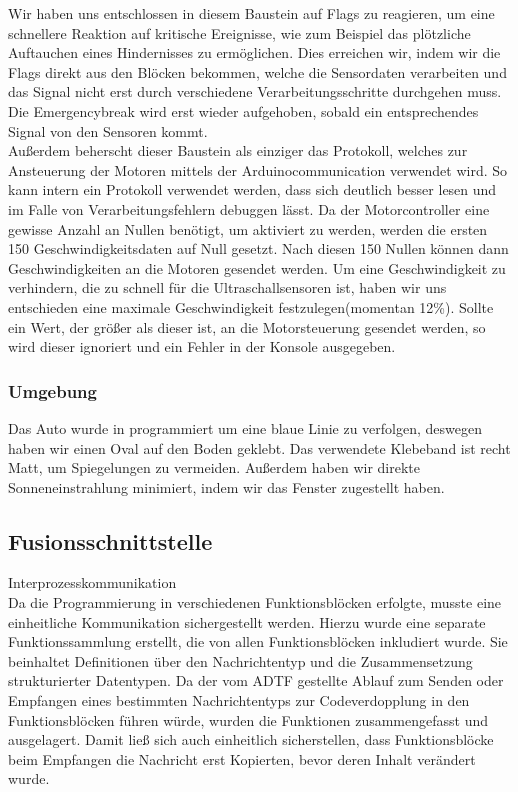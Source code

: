 \documentclass[12pt,a4paper]{report}
\begin{document}
Wir haben uns entschlossen in diesem Baustein auf Flags zu reagieren, um eine schnellere Reaktion auf kritische Ereignisse, wie zum Beispiel das plötzliche Auftauchen eines Hindernisses zu ermöglichen. Dies erreichen wir, indem wir die Flags direkt aus den Blöcken bekommen, welche die Sensordaten verarbeiten und das Signal nicht erst durch verschiedene Verarbeitungsschritte durchgehen muss. Die Emergencybreak wird erst wieder aufgehoben, sobald ein entsprechendes Signal von den Sensoren kommt.\\

Außerdem beherscht dieser Baustein als einziger das Protokoll, welches zur Ansteuerung der Motoren mittels der Arduinocommunication verwendet wird. So kann intern ein Protokoll verwendet werden, dass sich deutlich besser lesen und im Falle von Verarbeitungsfehlern debuggen lässt. Da der Motorcontroller eine gewisse Anzahl an Nullen benötigt, um aktiviert zu werden, werden die ersten 150 Geschwindigkeitsdaten auf Null gesetzt. Nach diesen 150 Nullen können dann Geschwindigkeiten an die Motoren gesendet werden. Um eine Geschwindigkeit zu verhindern, die zu schnell für die Ultraschallsensoren ist, haben wir uns entschieden eine maximale Geschwindigkeit festzulegen(momentan 12\%). Sollte ein Wert, der größer als dieser ist, an die Motorsteuerung gesendet werden, so wird dieser ignoriert und ein Fehler in der Konsole ausgegeben.

\subsubsection{Umgebung}
Das Auto wurde in programmiert um eine blaue Linie zu verfolgen, deswegen haben wir einen Oval auf den Boden geklebt. Das verwendete Klebeband ist recht Matt, um Spiegelungen zu vermeiden. Außerdem haben wir direkte Sonneneinstrahlung minimiert, indem wir das Fenster zugestellt haben.


\subsection{Fusionsschnittstelle}
Interprozesskommunikation\\
Da die Programmierung in verschiedenen Funktionsblöcken erfolgte, musste eine einheitliche Kommunikation sichergestellt werden. Hierzu wurde eine separate Funktionssammlung erstellt, die von allen Funktionsblöcken inkludiert wurde. Sie beinhaltet Definitionen über den Nachrichtentyp und die Zusammensetzung strukturierter Datentypen. Da der vom ADTF gestellte Ablauf zum Senden oder Empfangen eines bestimmten Nachrichtentyps zur Codeverdopplung in den Funktionsblöcken führen würde, wurden die Funktionen zusammengefasst und ausgelagert. Damit ließ sich auch einheitlich sicherstellen, dass Funktionsblöcke beim Empfangen die Nachricht erst Kopierten, bevor deren Inhalt verändert wurde.
\end{document}
